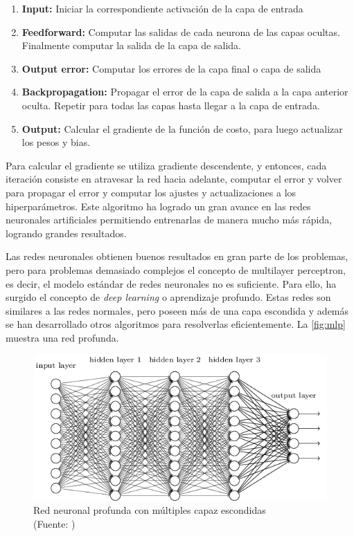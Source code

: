 \begin{enumerate}
\item \textbf{Input:} Iniciar la correspondiente activación de la capa de entrada

\item \textbf{Feedforward:} Computar las salidas de cada neurona de las capas ocultas. Finalmente computar la salida de la capa de salida.

\item \textbf{Output error:} Computar los errores de la capa final o capa de salida

\item \textbf{Backpropagation:} Propagar el error de la capa de salida a la capa anterior oculta. Repetir para todas las capas hasta llegar a la capa de entrada.

\item \textbf{Output:} Calcular el gradiente de la función de costo, para luego actualizar los pesos y bias.

\end{enumerate}

Para calcular el gradiente se utiliza gradiente descendente, y entonces, cada iteración consiste en atravesar la red hacia adelante, computar el error y volver para propagar el error y computar los ajustes y actualizaciones a los hiperparámetros. Este algoritmo ha logrado un gran avance en las redes neuronales artificiales permitiendo entrenarlas de manera mucho más rápida, logrando grandes resultados.

Las redes neuronales obtienen buenos resultados en gran parte de los problemas, pero para problemas demasiado complejos el concepto de multilayer perceptron, es decir, el modelo estándar de redes neuronales no es suficiente. Para ello, ha surgido el concepto de \textit{deep learning} o aprendizaje profundo. Estas redes son similares a las redes normales, pero poseen más de una capa escondida y además se han desarrollado otros algoritmos para resolverlas eficientemente. La \autoref{fig:mlp} muestra una red profunda.

\begin{figure}[ht!]
\centering
\includegraphics[width=.6\textwidth]{figures/deep.png}
\caption[Redes neuronales profundas]{Red neuronal profunda con múltiples capaz escondidas\\
{\scriptsize (Fuente: \cite{slp})}}
\label{fig:mlp}
\end{figure}

